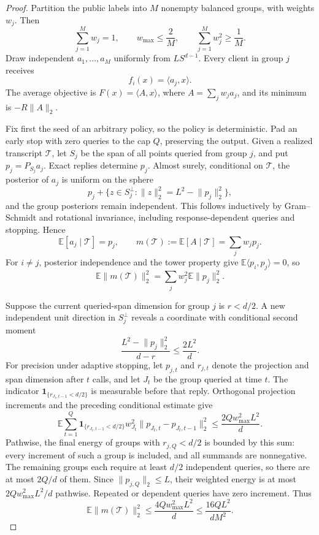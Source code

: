 \documentclass[11pt]{article}
\numberwithin{equation}{section}
\theoremstyle{remark}
\theoremstyle{definition}
\newcommand{\E}{\mathbb{E}}
\newcommand{\cT}{\mathcal{T}}
\newcommand{\ip}[2]{\langle #1,#2\rangle}
\newcommand{\norm}[1]{\lVert #1\rVert_2}
\newcommand{\ind}{\mathbf{1}}
\begin{document}
\begin{proof}
Partition the public labels into $M$ nonempty balanced groups, with weights $w_j$.  Then
\[
\sum_{j=1}^Mw_j=1,
\qquad
w_{\max}\le\frac2M,
\qquad
\sum_{j=1}^Mw_j^2\ge\frac1M.
\]
Draw independent $a_1,\ldots,a_M$ uniformly from $LS^{d-1}$.  Every client in group $j$ receives
\[
f_i(x)=\ip{a_j}{x}.
\]
The average objective is $F(x)=\ip A x$, where $A=\sum_jw_ja_j$, and its minimum is $-R\norm A$.

Fix first the seed of an arbitrary policy, so the policy is deterministic.
Pad an early stop with zero queries to the cap $Q$, preserving the output.
Given a realized transcript $\cT$, let $S_j$ be the span of all points queried from group $j$, and put $p_j=P_{S_j}a_j$.  Exact replies determine $p_j$.  Almost surely, conditional on $\cT$, the posterior of $a_j$ is uniform on the sphere
\[
p_j+\{z\in S_j^\perp:\norm z^2=L^2-\norm{p_j}^2\},
\]
and the group posteriors remain independent.  This follows inductively by Gram--Schmidt and rotational invariance, including response-dependent queries and stopping.  Hence
\[
\E[a_j\mid\cT]=p_j,
\qquad
m(\cT):=\E[A\mid\cT]=\sum_jw_jp_j.
\]
For $i\ne j$, posterior independence and the tower property give $\E\ip{p_i}{p_j}=0$, so
\[
\E\norm{m(\cT)}^2
=\sum_jw_j^2\E\norm{p_j}^2.
\]

Suppose the current queried-span dimension for group $j$ is $r<d/2$.  A new independent unit direction in $S_j^\perp$ reveals a coordinate with conditional second moment
\[
\frac{L^2-\norm{p_j}^2}{d-r}\le\frac{2L^2}{d}.
\]
For precision under adaptive stopping, let $p_{j,t}$ and $r_{j,t}$ denote
the projection and span dimension after $t$ calls, and let $J_t$ be the
group queried at time $t$. The indicator
$\ind_{\{r_{J_t,t-1}<d/2\}}$ is measurable before that reply. Orthogonal
projection increments and the preceding conditional estimate give
\[
\E\sum_{t=1}^Q
 \ind_{\{r_{J_t,t-1}<d/2\}}w_{J_t}^2
 \norm{p_{J_t,t}-p_{J_t,t-1}}^2
 \le\frac{2Qw_{\max}^2L^2}{d}.
\]
Pathwise, the final energy of groups with $r_{j,Q}<d/2$ is bounded by
this sum: every increment of such a group is included, and all summands
are nonnegative. The remaining groups each require at least $d/2$
independent queries, so there are at most $2Q/d$ of them. Since
$\norm{p_{j,Q}}\le L$, their weighted energy is at most
$2Qw_{\max}^2L^2/d$ pathwise. Repeated or dependent queries have zero
increment. Thus
\begin{equation}
\E\norm{m(\cT)}^2
\le\frac{4Qw_{\max}^2L^2}{d}
\le\frac{16QL^2}{dM^2}.
\label{eq:affine-posterior-energy}
\end{equation}


\end{proof}
\end{document}
